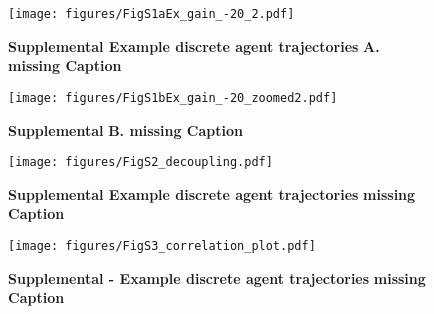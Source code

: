 \documentclass[10pt,a4paper]{article}
\begin{document}
\begin{figure}[!ht]
\begin{center}
\texttt{[image: figures/FigS1aEx\_gain\_-20\_2.pdf]}
\caption{{\bf Supplemental Example discrete agent trajectories} {\bf A. missing Caption} 
\label{fig:FigS1a}}
\end{center}
\end{figure}



\begin{figure}[!ht]
\begin{center}
\texttt{[image: figures/FigS1bEx\_gain\_-20\_zoomed2.pdf]}
\caption{{\bf Supplemental } {\bf B. missing Caption} 
\label{fig:FigS1b}}
\end{center}
\end{figure}



\begin{figure}[!ht]
\begin{center}
\texttt{[image: figures/FigS2\_decoupling.pdf]}
\caption{{\bf Supplemental Example discrete agent trajectories} {\bf missing Caption} 
\label{fig:FigS2}}
\end{center}
\end{figure}


\begin{figure}[!ht]
\begin{center}
\texttt{[image: figures/FigS3\_correlation\_plot.pdf]}
\caption{{\bf Supplemental - Example discrete agent trajectories} {\bf missing Caption} 
\label{fig:FigS3}}
\end{center}
\end{figure}




\clearpage



\end{document}
